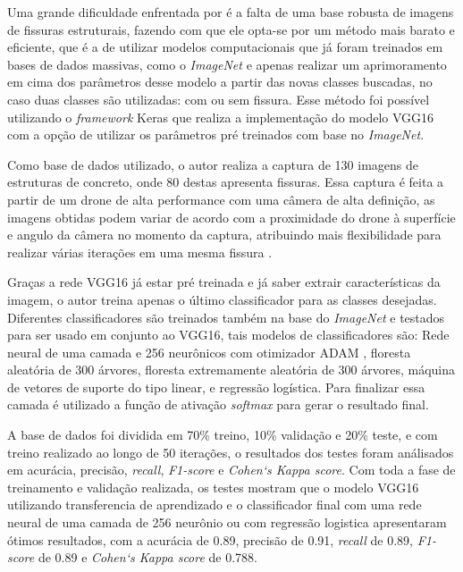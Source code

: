 Uma grande dificuldade enfrentada por  é a falta de uma base robusta de imagens de fissuras estruturais, fazendo com que ele opta-se por um método mais barato e eficiente, que é a de utilizar modelos computacionais que já foram treinados em bases de dados massivas, como o \textit{ImageNet} e apenas realizar um aprimoramento em cima dos parâmetros desse modelo a partir das novas classes buscadas, no caso duas classes são utilizadas: com ou sem fissura. 
Esse método foi possível utilizando o \textit{framework} Keras \cite{chollet2015keras} que realiza a implementação do modelo VGG16 com a opção de utilizar os parâmetros pré treinados com base no \textit{ImageNet}.

Como base de dados utilizado, o autor realiza a captura de 130 imagens de estruturas de concreto, onde 80 destas apresenta fissuras.
Essa captura é feita a partir de um drone de alta performance com uma câmera de alta definição, as imagens obtidas podem variar de acordo com a proximidade do drone à superfície e angulo da câmera no momento da captura, atribuindo mais flexibilidade para realizar várias iterações em uma mesma fissura \cite{gopalakrishnan2018crack}.

Graças a rede VGG16 já estar pré treinada e já saber extrair características da imagem, o autor treina apenas o último classificador para as classes desejadas. 
Diferentes classificadores são treinados também na base do \textit{ImageNet} e testados para ser usado em conjunto ao VGG16, tais modelos de classificadores são: Rede neural de uma camada e 256 neurônicos com otimizador ADAM \cite{kingma2014adam}, floresta aleatória de 300 árvores, floresta extremamente aleatória de 300 árvores, máquina de vetores de suporte do tipo linear, e regressão logística.
Para finalizar essa camada é utilizado a função de ativação \textit{softmax} para gerar o resultado final.

A base de dados foi dividida em 70\% treino, 10\% validação e 20\% teste, e com treino realizado ao longo de 50 iterações, o resultados dos testes foram análisados em acurácia, precisão, \textit{recall}, \textit{F1-score} e \textit{Cohen`s Kappa score}.
Com toda a fase de treinamento e validação realizada, os testes mostram que o modelo VGG16 utilizando transferencia de aprendizado e o classificador final com uma rede neural de uma camada de 256 neurônio ou com regressão logistica apresentaram ótimos resultados, com a acurácia de 0.89, precisão de 0.91, \textit{recall} de 0.89, \textit{F1-score} de 0.89 e \textit{Cohen`s Kappa score} de 0.788.

